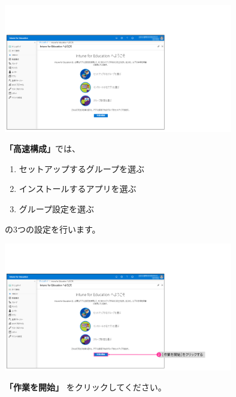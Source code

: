\begin{figure}[h]
    \begin{minipage}{0.6\textwidth}
        \vspace{-1cm}
        \includegraphics[width=10cm]{figures/Setup-Intune-02.png}
    \end{minipage}
    \begin{minipage}{0.4\textwidth}
        \textbf{「高速構成」}では、
        \begin{enumerate}
            \item セットアップするグループを選ぶ
            \item インストールするアプリを選ぶ
            \item グループ設定を選ぶ
        \end{enumerate}
        の3つの設定を行います。
    \end{minipage}
\end{figure}

\begin{figure}[h]
    \begin{minipage}{0.6\textwidth}
        \vspace{-1cm}
        \includegraphics[width=10cm]{figures/Setup-Intune-03.png}
    \end{minipage}
    \begin{minipage}{0.4\textwidth}
        \textbf{「作業を開始」} をクリックしてください。
    \end{minipage}
\end{figure}

